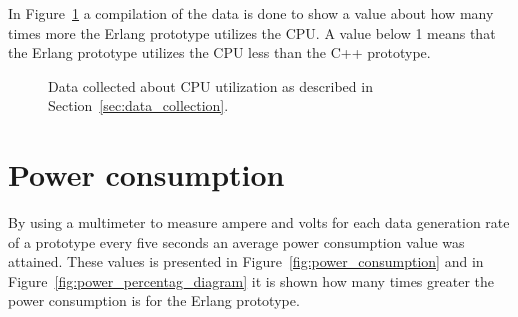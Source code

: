 In Figure~\ref{fig:cpu_percentag_diagram} a compilation of the data is done to show a value about how many times more the Erlang prototype utilizes the CPU. A value below 1 means that the Erlang prototype utilizes the CPU less than the C++ prototype.  

\begin{figure}[H]
    \centering
    \caption{Data collected about CPU utilization as described in Section~\ref{sec:data_collection}.}
    \label{fig:cpu_percentag_diagram}
\end{figure}

\section{Power consumption}
By using a multimeter to measure ampere and volts for each data generation rate of a prototype every five seconds an average power consumption value was attained. These values is presented in Figure~\ref{fig:power_consumption} and in Figure~\ref{fig:power_percentag_diagram} it is shown how many times greater the power consumption is for the Erlang prototype.

